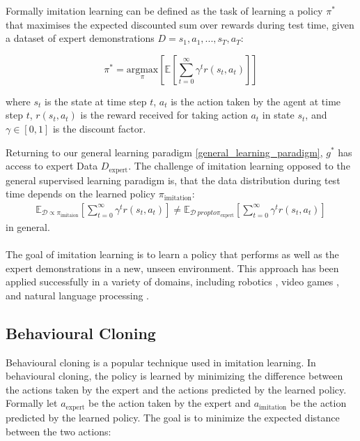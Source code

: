 Formally imitation learning can be defined as the task of learning a policy $\pi^*$ that maximises the expected discounted sum over rewards during test time, given a dataset of expert demonstrations $D = {s_1, a_1, ..., s_T, a_T}$:

\begin{equation}
    \pi^* = \underset{\pi}{\text{argmax}}\left[\mathbb{E} [\sum_{t=0}^{\infty} \gamma^t r(s_t, a_t)]\right]
\end{equation}

where $s_t$ is the state at time step $t$, $a_t$ is the action taken by the agent at time step $t$, $r(s_t, a_t)$ is the reward received for taking action $a_t$ in state $s_t$, and $\gamma \in [0,1]$ is the discount factor.

Returning to our general learning paradigm \ref{general_learning_paradigm}, $g^*$ has access to expert Data $D_{\text{expert}}$. 
The challenge of imitation learning 
opposed to the general supervised learning paradigm is, that the data distribution during test time depends on the learned policy $\pi_{\text{imitation}}$:
\begin{align}
    \mathbb{E}_{\mathcal{D} \propto \pi_{\text{imitaion}}}[\sum_{t=0}^{\infty} \gamma^t r(s_t, a_t)] \neq \mathbb{E}_{\mathcal{D} \ propto \pi_{\text{expert}}}[\sum_{t=0}^{\infty} \gamma^t r(s_t, a_t)]
\end{align}
in general.
\\ \\
The goal of imitation learning is to learn a policy that performs as well as the expert demonstrations in a new, unseen environment. 
This approach has been applied successfully in a variety of domains, including robotics \cite{stepputtis2020languageconditioned}, video games \cite{MUZero}, 
and natural language processing \cite{brown2020language}.

\subsection{Behavioural Cloning}
Behavioural cloning is a popular technique used in imitation learning. 
In behavioural cloning, the policy is learned by minimizing the difference between the actions taken by the expert and the 
actions predicted by the learned policy. Formally let $a_{\text{expert}}$ be the action taken by the expert and $a_{\text{imitation}}$ be the action 
predicted by the learned policy. The goal is to minimize the expected distance between the two actions:


